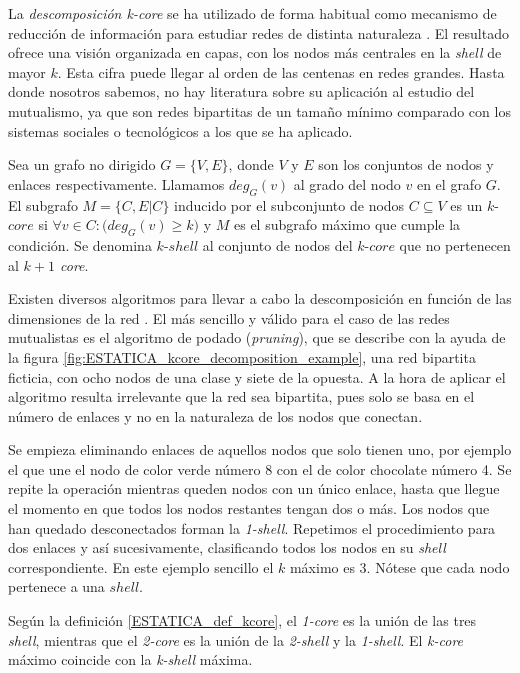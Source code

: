 La \textit{descomposición k-core} se ha utilizado de forma habitual como mecanismo de reducción de información para estudiar redes de distinta naturaleza \cite{kitsak2010identification, zhang2010using, barbera2015critical}. El resultado ofrece una visión organizada en capas, con los nodos más centrales en la \textit{shell} de mayor $k$. Esta cifra puede llegar al orden de las centenas en redes grandes. Hasta donde nosotros sabemos, no hay literatura sobre su aplicación al estudio del mutualismo, ya que son redes bipartitas de un tamaño mínimo comparado con los sistemas sociales o tecnológicos a los que se ha aplicado.

\begin{theo} 
Sea un grafo no dirigido $G = \{V, E\}$, donde $V$ y $E$ son los conjuntos de nodos y enlaces respectivamente. Llamamos $deg_G(v)$ al grado del nodo $v$ en el grafo $G$. El subgrafo $M = \{C, E|C\}$ inducido por el subconjunto de nodos $C \subseteq V$ es
un $k$-$core$ si $\forall v \in C: \big( deg_G(v) \geq k \big)$ y $M$ es el subgrafo máximo que cumple la condición. Se denomina $k$-$shell$ al conjunto de nodos del $k$-$core$ que no pertenecen al \textit{$k+1$ core}.
\label{ESTATICA_def_kcore}
\end{theo}

Existen diversos algoritmos para llevar a cabo la descomposición en función de las dimensiones de la red \cite{montresor2013distributed}. El más sencillo y válido para el caso de las redes mutualistas es el algoritmo de podado (\textit{pruning}), que se describe con la ayuda de la figura \ref{fig:ESTATICA_kcore_decomposition_example}, una red bipartita ficticia, con ocho nodos de una clase y siete de la opuesta. A la hora de aplicar el algoritmo resulta irrelevante que la red sea bipartita, pues solo se basa en el número de enlaces y no en la naturaleza de los nodos que conectan.

Se empieza eliminando enlaces de aquellos nodos que solo tienen uno, por ejemplo el que une el nodo de color verde número 8 con el de color chocolate número 4. Se repite la operación mientras queden nodos con un único enlace, hasta que llegue el momento en que todos los nodos restantes tengan dos o más. Los nodos que han quedado desconectados forman la \textit{1-shell}. Repetimos el procedimiento para dos enlaces y así sucesivamente, clasificando todos los nodos en su \textit{shell} correspondiente. En este ejemplo sencillo el $k$ máximo es 3. Nótese que cada nodo pertenece a una $shell$.


Según la definición \ref{ESTATICA_def_kcore}, el  \textit{1-core} es la unión de las tres \textit{shell}, mientras que el \textit{2-core} es la unión de la \textit{2-shell} y la \textit{1-shell}. El \textit{k-core} máximo coincide con la  \textit{k-shell} máxima. 

